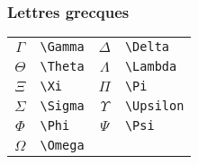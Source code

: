 \begin{frame}[containsverbatim]
    \frametitle{Lettres grecques}
    \begin{table}
        \centering
        \begin{tabular}{|c|l||c|l|}
            \hline
            $\Gamma$ & \verb|\Gamma| & $\Delta$   & \verb|\Delta|   \\
            $\Theta$ & \verb|\Theta| & $\Lambda$  & \verb|\Lambda|  \\
            $\Xi$    & \verb|\Xi|    & $\Pi$      & \verb|\Pi|      \\
            $\Sigma$ & \verb|\Sigma| & $\Upsilon$ & \verb|\Upsilon| \\
            $\Phi$   & \verb|\Phi|   & $\Psi$     & \verb|\Psi|     \\
            $\Omega$ & \verb|\Omega| &            &                 \\
            \hline
        \end{tabular}
    \end{table}
\end{frame}